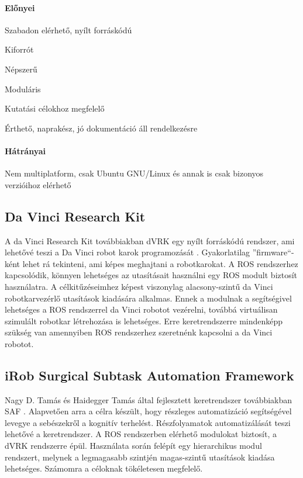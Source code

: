 \documentclass[12pt,a4paper,oneside]{report} %
\begin{document}
\paragraph{Előnyei} 
\begin{compactitem}
	\item Szabadon elérhető, nyílt forráskódú
	\item Kiforrót
	\item Népszerű
	\item Moduláris
	\item Kutatási célokhoz megfelelő
	\item Érthető, naprakész, jó dokumentáció áll rendelkezésre
\end{compactitem}
\paragraph{Hátrányai} 
\begin{compactitem}
	\item Nem multiplatform, csak Ubuntu GNU/Linux és annak is csak bizonyos verzióihoz elérhető
\end{compactitem}

\subsection{Da Vinci Research Kit}
\label{davinci}
A da Vinci Research Kit továbbiakban dVRK egy nyílt forráskódú rendszer, ami lehetővé teszi a Da Vinci robot karok programozását \cite{kazanzides2014open}. Gyakorlatilag ''firmware``-ként lehet rá tekinteni, ami képes meghajtani a robotkarokat.  A ROS rendszerhez kapcsolódik, könnyen lehetséges az utasításait használni egy ROS  modult biztosít használatra.  A célkitűzéseimhez képest viszonylag alacsony-szintű da Vinci robotkarvezérlő utasítások kiadására alkalmas.
Ennek a modulnak a segítségivel lehetséges a ROS rendszerrel da Vinci robotot vezérelni, továbbá virtuálisan szimulált robotkar létrehozása is lehetséges. Erre keretrendszerre mindenképp szükség van amennyiben ROS rendszerhez szeretnénk kapcsolni a da Vinci robotot. 
\subsection{iRob Surgical Subtask Automation Framework}
\label{irob}
Nagy D. Tamás és Haidegger Tamás által fejlesztett keretrendszer továbbiakban SAF \cite{irobsaf2019}.
Alapvetően arra a célra készült, hogy részleges automatizáció segítségével levegye a sebészekről a kognitív terhelést. Részfolyamatok automatizálását teszi lehetővé a keretrendszer. A ROS rendszerben elérhető modulokat biztosít, a dVRK rendszerre épül. Használata során felépít egy hierarchikus modul rendszert, melynek a legmagasabb szintjén magas-szintű utasítások kiadása lehetséges. Számomra a céloknak tökéletesen megfelelő.
\end{document}
